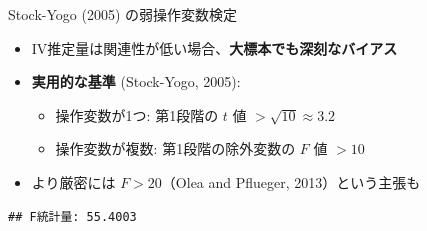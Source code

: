 \documentclass[
  ignorenonframetext,
]{beamer}
\newenvironment{Shaded}{\begin{snugshade}}{\end{snugshade}}
\newcommand{\CommentTok}[1]{\textcolor[rgb]{0.56,0.35,0.01}{\textit{#1}}}
\newcommand{\DecValTok}[1]{\textcolor[rgb]{0.00,0.00,0.81}{#1}}
\newcommand{\FunctionTok}[1]{\textcolor[rgb]{0.13,0.29,0.53}{\textbf{#1}}}
\newcommand{\NormalTok}[1]{#1}
\newcommand{\OtherTok}[1]{\textcolor[rgb]{0.56,0.35,0.01}{#1}}
\newcommand{\SpecialCharTok}[1]{\textcolor[rgb]{0.81,0.36,0.00}{\textbf{#1}}}
\newcommand{\StringTok}[1]{\textcolor[rgb]{0.31,0.60,0.02}{#1}}
\providecommand{\tightlist}{%
  \setlength{\itemsep}{0pt}\setlength{\parskip}{0pt}}
\begin{document}
\begin{frame}[fragile]{Stock-Yogo (2005) の弱操作変数検定}
\label{stock-yogo-2005-ux306eux5f31ux64cdux4f5cux5909ux6570ux691cux5b9a}
\begin{itemize}
\tightlist
\item
  IV推定量は関連性が低い場合、\textbf{大標本でも深刻なバイアス}
\item
  \textbf{実用的な基準} (Stock-Yogo, 2005):

  \begin{itemize}
  \tightlist
  \item
    操作変数が1つ: 第1段階の \(t\) 値 \(> \sqrt{10} \approx 3.2\)
  \item
    操作変数が複数: 第1段階の除外変数の \(F\) 値 \(> 10\)
  \end{itemize}
\item
  より厳密には \(F > 20\)（Olea and Pflueger, 2013）という主張も
\end{itemize}

\scriptsize

\begin{Shaded}
\end{Shaded}

\begin{verbatim}
## F統計量: 55.4003
\end{verbatim}

\normalsize
\end{frame}
\end{document}
